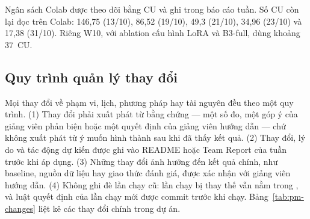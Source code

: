 Ngân sách Colab được theo dõi bằng CU và ghi trong báo cáo tuần. Số CU còn lại
đọc trên Colab: 146,75 (13/10), 86,52 (19/10), 49,3 (21/10), 34,96 (23/10) và
17,38 (31/10). Riêng W10, với ablation cấu hình LoRA và B3-full, dùng khoảng
37~CU.

\subsection{Quy trình quản lý thay đổi}
\label{sec:pm-change}

Mọi thay đổi về phạm vi, lịch, phương pháp hay tài nguyên đều theo một quy trình.
(1) Thay đổi phải xuất phát từ bằng chứng --- một số đo, một góp ý của giảng viên phản
biện hoặc một quyết định của giảng viên hướng dẫn --- chứ không xuất phát từ ý muốn hình
thành sau khi đã thấy kết quả. (2) Thay đổi, lý do và tác động dự kiến được ghi vào
README hoặc Team Report của tuần trước khi áp dụng. (3) Những thay đổi ảnh hưởng đến kết
quả chính, như baseline, nguồn dữ liệu hay giao thức đánh giá, được xác nhận với giảng
viên hướng dẫn. (4) Không ghi đè lần chạy cũ: lần chạy bị thay thế vẫn nằm trong
, và luật quyết định của lần chạy mới được commit trước khi chạy.
Bảng~\ref{tab:pm-changes} liệt kê các thay đổi chính trong dự án.

